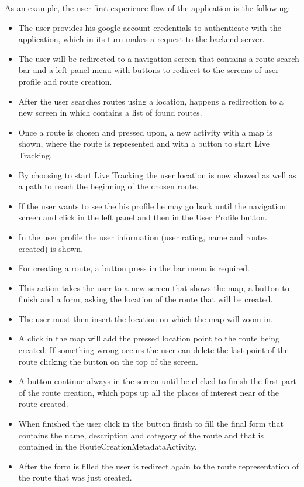As an example, the user first experience flow of the application is the following:
        \begin{itemize}
                \item The user provides his google account credentials to authenticate with the application, which in its turn makes a request to the backend server.
                \item The user will be redirected to a navigation screen that contains a route search bar and a left panel menu with buttons to redirect to the screens of user profile and route creation.
                \item After the user searches routes using a location, happens a redirection to a new screen in which contains a list of found routes.
                \item Once a route is chosen and pressed upon, a new activity with a map is shown, where the route is represented and with a button to start Live Tracking.
                \item By choosing to start Live Tracking the user location is now showed as well as a path to reach the beginning of the chosen route.
                \item If the user wants to see the his profile he may go back until the navigation screen and click in the left panel and then in the User Profile button.
                \item In the user profile the user information (user rating, name and routes created) is shown.
                \item For creating a route, a button press in the bar menu is required.
                \item This action takes the user to a new screen that shows the map, a button to finish and a form, asking the location of the route that will be created.
                \item The user must then insert the location on which the map will zoom in.
                \item A click in the map will add the pressed location point to the route being created. If something wrong occurs the user can delete the last point of the route clicking the button on the top of the screen.
                \item A button continue always in the screen until be clicked to finish the first part of the route creation, which pops up all the places of interest near of the route created.
                \item When finished the user click in the button finish to fill the final form that contains the name, description and category of the route and that is contained in the RouteCreationMetadataActivity.
                \item After the form is filled the user is redirect again to the route representation of the route that was just created.
        \end{itemize}

